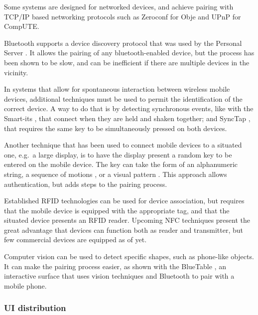 Some systems are designed for networked devices, and achieve pairing with TCP/IP based networking protocols such as Zeroconf \citeyearpar{zeroconf} for Obje and UPnP \citeyearpar{upnp} for CompUTE.

Bluetooth \citeyearpar{bluetooth} supports a device discovery protocol that was used by the Personal Server \citep{Want:2002:personalserver}.
It allows the pairing of any bluetooth-enabled device, but the process has been shown to be slow, and can be inefficient if there are multiple devices in the vicinity.

In systems that allow for spontaneous interaction between wireless mobile devices, additional techniques must be used to permit the identification of the correct device.
A way to do that is by detecting synchronous events, like with the Smart-its \citep{Holmquist:2001:smartits}, that connect when they are held and shaken together; and SyncTap \citep{Rekimoto:2003:synctap}, that requires the same key to be simultaneously pressed on both devices.

Another technique that has been used to connect mobile devices to a situated one, e.g.\ a large display, is to have the display present a random key to be entered on the mobile device.
The key can take the form of an alphanumeric string, a sequence of motions \citep{Patel:2004:mobileauth}, or a visual pattern \citep{Ballagas:2005:sweeppointshoot, Scott:2005:visualauth}.
This approach allows authentication, but adds steps to the pairing process.

Established RFID technologies can be used for device association, but requires that the mobile device is equipped with the appropriate tag, and that the situated device presents an RFID reader.
Upcoming NFC techniques present the great advantage that devices can function both as reader and transmitter, but few commercial devices are equipped as of yet.

Computer vision can be used to detect specific shapes, such as phone-like objects.
It can make the pairing process easier, as shown with the BlueTable \citep{Wilson:2007:bluetable}, an interactive surface that uses vision techniques and Bluetooth to pair with a mobile phone.

\subsubsection{UI distribution}

